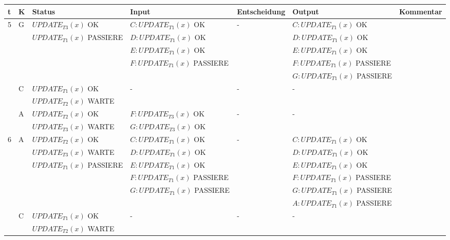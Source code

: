 \documentclass[a4paper, landscape]{article}
\begin{document}
\begin{tabular}{| l | l | l | l | l | l | p{6cm} |}
\hline
t & K & Status & Input & Entscheidung & Output & Kommentar \\
\hline
\hline


5 & \multirow{5}{*}{G} 
			&	$UPDATE_{T3}(x)$ OK 					 & $C: UPDATE_{T1}(x)$ OK	& - &	 $C: UPDATE_{T1}(x)$ OK &\\
			& &$UPDATE_{T1}(x)$ PASSIERE & $D: UPDATE_{T1}(x)$ OK &   &		 $D: UPDATE_{T1}(x)$ OK &\\
			& &																	   	& $E: UPDATE_{T1}(x)$ OK& 	& 	    $E: UPDATE_{T1}(x)$ OK & \\
			& &																	   	& $F: UPDATE_{T1}(x)$ PASSIERE& 	& 	 $F: UPDATE_{T1}(x)$ PASSIERE & \\
			& &																	   	&																					& 	& 	 $G: UPDATE_{T1}(x)$ PASSIERE & \\
\cline{2-7}
& \multirow{2}{*}{C} 
			&   $UPDATE_{T1}(x)$ OK 		& - 	& - &	 -  &\\
			&& $UPDATE_{T2}(x)$ WARTE   &   &   &	   &  \\
\cline{2-7}
& \multirow{2}{*}{A} 
			&    $UPDATE_{T2}(x)$ OK	      & $F: UPDATE_{T3}(x)$ OK	& - &	- &\\
			&&  $UPDATE_{T3}(x)$ WARTE  & 	$G: UPDATE_{T3}(x)$ OK  &    &   & \\
\hline
\hline


6 & \multirow{6}{*}{A} 
			&    $UPDATE_{T2}(x)$ OK	      &  $C: UPDATE_{T1}(x)$ OK 	& - &	$C: UPDATE_{T1}(x)$ OK &\\
			&&  $UPDATE_{T3}(x)$ WARTE  & $D: UPDATE_{T1}(x)$ OK  &    &   $D: UPDATE_{T1}(x)$ OK & \\
			&&  $UPDATE_{T1}(x)$ PASSIERE & $E: UPDATE_{T1}(x)$ OK &    &  $E: UPDATE_{T1}(x)$ OK & \\
			& &																	   	& $F: UPDATE_{T1}(x)$ PASSIERE & & $F: UPDATE_{T1}(x)$ PASSIERE &\\
			& &																	   	& $G: UPDATE_{T1}(x)$ PASSIERE & & $G: UPDATE_{T1}(x)$ PASSIERE& \\
			& &																	   	&																					 & & $A: UPDATE_{T1}(x)$ PASSIERE& \\
\cline{2-7}
& \multirow{2}{*}{C} 
			&   $UPDATE_{T1}(x)$ OK 		& - 	& - &	 -  &\\
			&& $UPDATE_{T2}(x)$ WARTE   &   &   &	   &  \\
\hline
\hline



\end{tabular}
\end{document}
